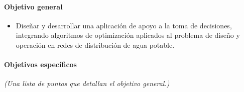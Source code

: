 \documentclass[11pt,letterpaper]{article}
\begin{document}
\paragraph{Objetivo general}

\begin{itemize}
\item Diseñar y desarrollar una aplicación de apoyo a la toma de decisiones, integrando algoritmos de optimización aplicados al problema de diseño y operación en redes de distribución de agua potable.
\end{itemize}

\paragraph{Objetivos específicos} \emph{(Una lista de puntos que detallan el objetivo general.)}
\end{document}
